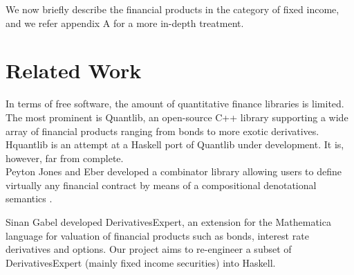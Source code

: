 We now briefly describe the financial products in the category of fixed income, and we refer appendix A for a more in-depth treatment.

\section{Related Work}

In terms of free software, the amount of quantitative finance libraries is limited.
The most prominent is Quantlib\cite{Ame2003}, an open-source C++ library supporting a wide array of financial products ranging from bonds to more exotic derivatives.
Hquantlib\cite{hquantlib} is an attempt at a Haskell port of Quantlib under development. It is, however, far from complete.\\

Peyton Jones and Eber developed a combinator library\cite{composingcontracts} allowing users to define virtually any financial contract by means of a compositional denotational semantics .

Sinan Gabel developed DerivativesExpert\cite{Mathematica:DerivativesExpert}, an
extension for the Mathematica language for valuation of financial products such as bonds, interest rate derivatives and options. Our project aims to re-engineer a subset of DerivativesExpert (mainly fixed income securities) into Haskell.
